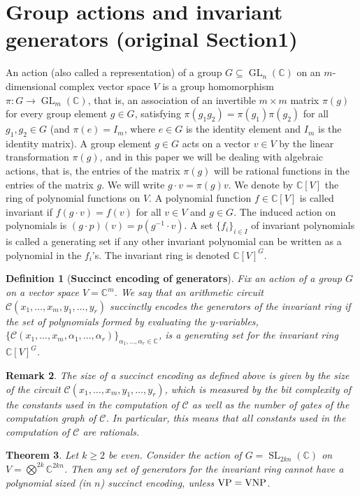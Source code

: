 \documentclass[10pt,a4paper]{article}
\newtheorem{theorem}{Theorem}
\newtheorem{definition}[theorem]{Definition}
\newtheorem{remark}[theorem]{Remark}
\newcommand{\C}{\mathbb C}
\newcommand{\SL}{\operatorname{SL}}
\newcommand{\GL}{\operatorname{GL}}
\newcommand{\cC}{\mathcal C}
\newcommand{\tensor}{\textstyle\bigotimes}
\begin{document}
\section*{Group actions and invariant generators (original Section1)}
An action (also called a representation) of a group $G\subseteq\GL_n(\C)$ on an $m$-dimensional complex vector space $V$ is a group homomorphism $\pi:G\to\GL_m(\C)$, that is, an association of an invertible $m\times m$ matrix $\pi(g)$ for every group element $g\in G$, satisfying $\pi(g_1g_2)=\pi(g_1)\pi(g_2)$ for all $g_1,g_2\in G$ (and $\pi(e)=I_m$, where $e\in G$ is the identity element and $I_m$ is the identity matrix). A group element $g\in G$ acts on a vector $v\in V$ by the linear transformation $\pi(g)$, and in this paper we will be dealing with algebraic actions, that is, the entries of the matrix $\pi(g)$ will be rational functions in the entries of the matrix $g$. We will write $g\cdot v=\pi(g)v$. We denote by $\C[V]$ the ring of polynomial functions on $V$.
A polynomial function $f\in\C[V]$ is called invariant if $f(g\cdot v)=f(v)$ for all $v\in V$ and $g\in G$. The induced action on polynomials is $(g\cdot p)(v)=p(g^{-1}\cdot v)$. A set $\{f_i\}_{i\in I}$ of invariant polynomials is called a generating set if any other invariant polynomial can be written as a polynomial in the $f_i$'s. The invariant ring is denoted $\C[V]^G$.
\setcounter{theorem}{2}
\begin{definition}[\textbf{Succinct encoding of generators}] \label{def:succ.enc}
	Fix an action of a group $G$ on a vector space $V = \C^m$. We say that an arithmetic circuit
	$\cC(x_1,\ldots, x_m,y_1,\ldots, y_r)$ \emph{succinctly encodes} the generators of the invariant
	ring if the set of polynomials formed by evaluating the $y$-variables,
	$\{\cC(x_1,\ldots, x_m, \alpha_1,\ldots, \alpha_r)\}_{\alpha_1,\ldots, \alpha_r \in \C}$,
  is a generating set for the invariant ring~$\C[V]^G$.
\end{definition}

\begin{remark}
	The \emph{size} of a succinct encoding as defined above is given by the size of the circuit
	$\cC(x_1, \ldots, x_m, y_1, \ldots, y_r)$, which is measured by the bit complexity of the
	constants used in the computation of $\cC$ as well as the number of gates of the computation
	graph of $\cC$.
  In particular, this means that all constants used in the computation of $\cC$ are rationals.
\end{remark}

\setcounter{theorem}{10}
\begin{theorem}\label{MC-cex}
Let $k \geq 2$ be even.
Consider the action of $G = \SL_{2kn}(\C)$ on $V = \tensor^{2k} \C^{2kn}$. Then any set of generators for the invariant ring cannot have a polynomial sized (in $n$) succinct encoding, unless ${\rm VP = VNP}$.
\end{theorem}
\end{document}
